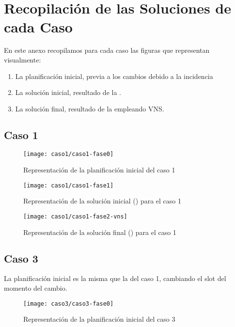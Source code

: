 \graphicspath{{anexos/AnexoF-Recopilacion-Soluciones-Por-Fases/recursos/}}

\section{Recopilación de las Soluciones de cada Caso} \label{Anexo:recopilacion-soluciones-por-fases}

En este anexo recopilamos para cada caso las figuras que representan visualmente:
\begin{enumerate}
	\item La planificación inicial, previa a los cambios debido a la incidencia
	\item La solución inicial, resultado de la \faseuno{}.
	\item La solución final, resultado de la \fasedos{} empleando VNS. %
\end{enumerate}


\newpage
\subsection{Caso 1}

\begin{figure}[!h]
	\centering
	\texttt{[image: caso1/caso1-fase0]}
	\caption{Representación de la planificación inicial del caso 1}
	\label{fig:caso1-fase0}
\end{figure}

\begin{figure}[!h]
	\centering
	\texttt{[image: caso1/caso1-fase1]}
	\caption{Representación de la solución inicial (\faseuno{}) para el caso 1}
	\label{fig:caso1-fase1}
\end{figure}

\begin{figure}[!h]
	\centering
	\texttt{[image: caso1/caso1-fase2-vns]}
	\caption{Representación de la solución final (\fasedos{}) para el caso 1}
	\label{fig:caso1-fase2}
\end{figure}

\FloatBarrier
\newpage
\subsection{Caso 3}

La planificación inicial es la misma que la del caso 1, cambiando el slot del momento del cambio.

\begin{figure}[!h]
	\centering
	\texttt{[image: caso3/caso3-fase0]}
	\caption{Representación de la planificación inicial del caso 3}
	\label{fig:caso3-fase0}
\end{figure}

